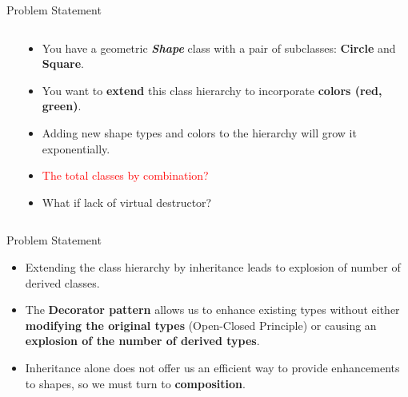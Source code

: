 \documentclass[13pt]{beamer}
\begin{document}
\begin{frame}{Problem Statement}
	\begin{columns}[T]
		\begin{column}{.5\textwidth}
		\end{column}
	
		\begin{column}{.5\textwidth}
			\begin{itemize}
				\item You have a geometric \textbf{\textit{Shape}} class with a pair of subclasses: \textbf{Circle} and \textbf{Square}.
				\item You want to \textbf{extend} this class hierarchy to incorporate \textbf{colors (red, green)}.
				\item Adding new shape types and colors to the hierarchy will grow it exponentially.
				\item \textcolor{red}{The total classes by combination?}
				\item What if lack of virtual destructor?
			\end{itemize}
		\end{column}
	\end{columns}
\end{frame}

\begin{frame}{Problem Statement}
	\begin{itemize}
		\setlength\itemsep{1em}
		\item Extending the class hierarchy by inheritance leads to explosion of number of derived classes.
		\item The \textbf{Decorator pattern} allows us to enhance existing types without
		either \textbf{modifying the original types} (Open-Closed Principle) or causing an
		\textbf{explosion of the number of derived types}.
		\item Inheritance alone does not offer us an efficient way to provide enhancements to shapes, so we must turn to \textbf{composition}.
	\end{itemize}
\end{frame}
\end{document}
